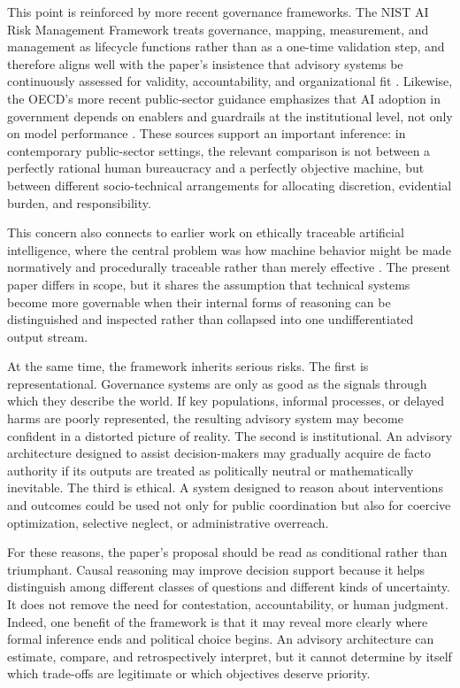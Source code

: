 \documentclass[11pt]{article}
\begin{document}
This point is reinforced by more recent governance frameworks. The NIST AI Risk Management Framework treats governance, mapping, measurement, and management as lifecycle functions rather than as a one-time validation step, and therefore aligns well with the paper's insistence that advisory systems be continuously assessed for validity, accountability, and organizational fit \citep{tabassi2023airmf}. Likewise, the OECD's more recent public-sector guidance emphasizes that AI adoption in government depends on enablers and guardrails at the institutional level, not only on model performance \citep{oecd2024governing}. These sources support an important inference: in contemporary public-sector settings, the relevant comparison is not between a perfectly rational human bureaucracy and a perfectly objective machine, but between different socio-technical arrangements for allocating discretion, evidential burden, and responsibility.

This concern also connects to earlier work on ethically traceable artificial intelligence, where the central problem was how machine behavior might be made normatively and procedurally traceable rather than merely effective \citep{tucker2017ethical}. The present paper differs in scope, but it shares the assumption that technical systems become more governable when their internal forms of reasoning can be distinguished and inspected rather than collapsed into one undifferentiated output stream.

At the same time, the framework inherits serious risks. The first is representational. Governance systems are only as good as the signals through which they describe the world. If key populations, informal processes, or delayed harms are poorly represented, the resulting advisory system may become confident in a distorted picture of reality. The second is institutional. An advisory architecture designed to assist decision-makers may gradually acquire de facto authority if its outputs are treated as politically neutral or mathematically inevitable. The third is ethical. A system designed to reason about interventions and outcomes could be used not only for public coordination but also for coercive optimization, selective neglect, or administrative overreach.

For these reasons, the paper's proposal should be read as conditional rather than triumphant. Causal reasoning may improve decision support because it helps distinguish among different classes of questions and different kinds of uncertainty. It does not remove the need for contestation, accountability, or human judgment. Indeed, one benefit of the framework is that it may reveal more clearly where formal inference ends and political choice begins. An advisory architecture can estimate, compare, and retrospectively interpret, but it cannot determine by itself which trade-offs are legitimate or which objectives deserve priority.
\end{document}
